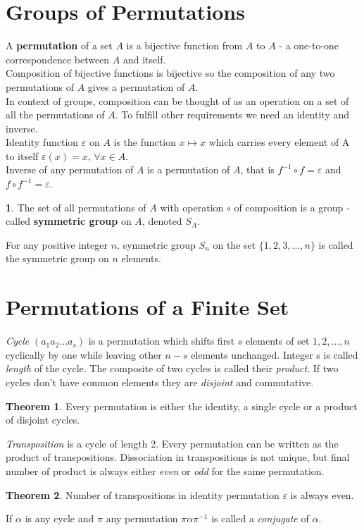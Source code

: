 \documentclass[a4paper,12pt]{article}
\theoremstyle{definition}
\newtheorem{definition}{}[section]
\theoremstyle{axiom}
\theoremstyle{theorem}
\newtheorem{theorem}{Theorem}[section]
\begin{document}
\section{Groups of Permutations}
A \textbf{permutation} of a set $A$ is a bijective function from $A$ to $A$ - a one-to-one correspondence between $A$ and itself. 
\\
Composition of bijective functions is bijective so the composition of any two permutations of $A$ gives a permutation of $A$.
\\
In context of groups, composition can be thought of as an operation on a set of all the permutations of $A$. To fulfill other requirements we need an identity and inverse.
\\
Identity function $\varepsilon$ on $A$ is the function $x \mapsto x$ which carries every element of A to itself $\varepsilon(x) = x$, $\forall x \in A$.
\\
Inverse of any permutation of $A$ is a permutation of $A$, that is $f^{-1} \circ f = \varepsilon$ and $f \circ f^{-1}= \varepsilon$.
\begin{definition}{}
        \textnormal{The set of all permutations of $A$ with operation $\circ$ of composition is a group - called \textbf{symmetric group} on $A$, denoted $S_A$.}
\end{definition}
For any positive integer $n$, symmetric group $S_n$ on the set $\{1, 2, 3, \dots, n\}$ is called the symmetric group on $n$ elements.
\section{Permutations of a Finite Set}
\textit{Cycle} $(a_1a_2 \dots a_s)$ is a permutation which shifts first $s$ elements of set ${1,2,\dots ,n}$ cyclically by one while leaving other $n-s$ elements unchanged. Integer s is called \textit{length} of the cycle. The composite of two cycles is called their \textit{product}. If two cycles don't have common elements they are \textit{disjoint} and commutative.
\begin{theorem}{}
Every permutation is either the identity, a single cycle or a product of disjoint cycles.
\end{theorem}
\textit{Transposition} is a cycle of length 2. Every permutation can be written as the product of transpositions. Dissociation in transpositions is not unique, but final number of product is always either \textit{even} or \textit{odd} for the same permutation.
\begin{theorem}{}
Number of transpositions in identity permutation $\varepsilon$ is always even.
\end{theorem}
If $\alpha$ is any cycle and $\pi$ any permutation $\pi\alpha\pi^{-1}$ is called a \textit{conjugate} of $\alpha$.
\end{document}
